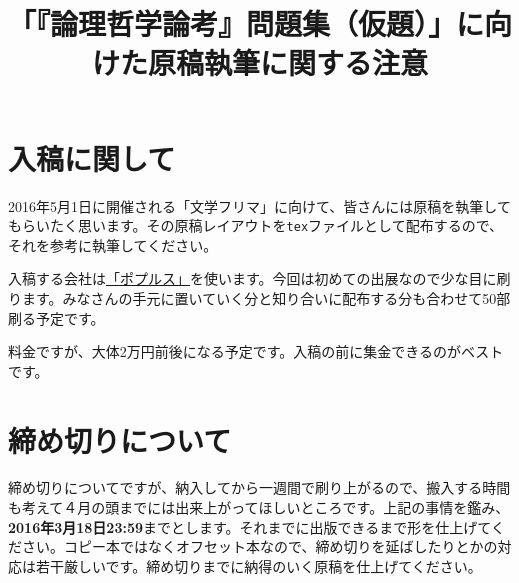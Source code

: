 \documentclass[11pt,a4paper,onecolumn,article]{jarticle}
\title{「『論理哲学論考』問題集（仮題）」に向けた原稿執筆に関する注意}
\date{}
\begin{document}
  \maketitle

  \section{入稿に関して}
  2016年5月1日に開催される「文学フリマ」に向けて、皆さんには原稿を執筆してもらいたく思います。その原稿レイアウトを\texttt{tex}ファイルとして配布するので、それを参考に執筆してください。

  入稿する会社は\href{http://www.inv.co.jp/~popls/}{「ポプルス」}を使います。今回は初めての出展なので少な目に刷ります。みなさんの手元に置いていく分と知り合いに配布する分も合わせて50部刷る予定です。

  料金ですが、大体2万円前後になる予定です。入稿の前に集金できるのがベストです。

  \section{締め切りについて}

  締め切りについてですが、納入してから一週間で刷り上がるので、搬入する時間も考えて４月の頭までには出来上がってほしいところです。上記の事情を鑑み、{\bf 2016年3月18日23:59}までとします。それまでに出版できるまで形を仕上げてください。コピー本ではなくオフセット本なので、締め切りを延ばしたりとかの対応は若干厳しいです。締め切りまでに納得のいく原稿を仕上げてください。
\end{document}
